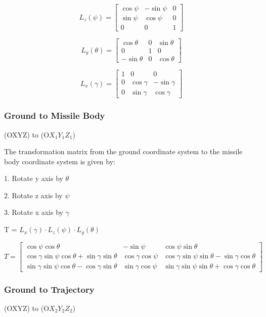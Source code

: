 \documentclass{article}
\begin{document}
\[
L_z(\psi) = 
\begin{bmatrix}
\cos \psi & -\sin \psi & 0 \\
\sin \psi & \cos \psi & 0 \\
0 & 0 & 1
\end{bmatrix}
\]


\[
L_y(\theta) = 
\begin{bmatrix}
\cos \theta & 0 & \sin \theta \\
0 & 1 & 0 \\
-\sin \theta & 0 & \cos \theta
\end{bmatrix}
\]

\[
L_x(\gamma) = 
\begin{bmatrix}
1 & 0 & 0 \\
0 & \cos \gamma & -\sin \gamma \\
0 & \sin \gamma & \cos \gamma
\end{bmatrix}
\]

\subsubsection{Ground to Missile Body}

(OXYZ) to (O\(X_1Y_1Z_1\))

The transformation matrix from the ground coordinate system to the missile body coordinate system is given by:

1. Rotate y axis by \(\theta\)

2. Rotate z axis by \(\psi\)

3. Rotate x axis by \(\gamma\)

T = \(L_x(\gamma) \cdot L_z(\psi) \cdot L_y(\theta)\)

\[
T =
\begin{bmatrix}
\cos \psi \cos \theta & -\sin \psi & \cos \psi \sin \theta \\
\cos \gamma \sin \psi \cos \theta + \sin \gamma \sin \theta & \cos \gamma \cos \psi & \cos \gamma \sin \psi \sin \theta - \sin \gamma \cos \theta \\
\sin \gamma \sin \psi \cos \theta - \cos \gamma \sin \theta & \sin \gamma \cos \psi & \sin \gamma \sin \psi \sin \theta + \cos \gamma \cos \theta
\end{bmatrix}
\]
\newpage

\subsubsection{Ground to Trajectory}

(OXYZ) to (O\(X_2Y_2Z_2\))
\end{document}
